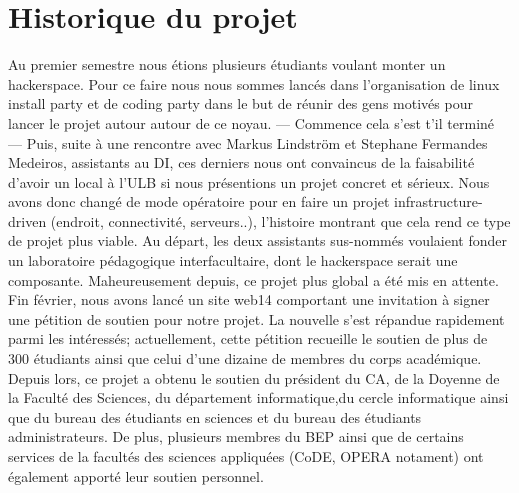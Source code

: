 \documentclass[a4paper]{article}
\begin{document}
\section{Historique du projet} %
Au  premier semestre nous étions plusieurs étudiants voulant monter un  hackerspace. Pour ce faire nous nous sommes lancés dans l’organisation  de linux install party et de coding party dans le but de réunir des  gens motivés pour lancer le projet autour autour de ce noyau. --- Commence cela s'est t'il terminé ---
Puis,  suite à une rencontre avec Markus Lindström et Stephane Fermandes  Medeiros, assistants au DI, ces derniers nous ont convaincus de la  faisabilité d’avoir un local à l’ULB si nous présentions un projet  concret et sérieux. Nous avons donc changé  de mode opératoire pour en faire un projet infrastructure-driven  (endroit, connectivité, serveurs..), l’histoire montrant que cela rend  ce type de projet plus viable. Au départ, les deux assistants  sus-nommés voulaient fonder un laboratoire pédagogique  interfacultaire, dont le hackerspace serait une composante.  Maheureusement depuis, ce projet plus global a été mis en attente.
Fin  février, nous avons lancé un site web14 comportant une invitation à  signer une pétition de soutien pour notre projet. La nouvelle s’est  répandue rapidement parmi les intéressés; actuellement, cette  pétition recueille le soutien de plus de 300 étudiants ainsi que celui d’une dizaine de membres du corps académique.
Depuis lors,  ce projet a obtenu le soutien du président du CA, de la Doyenne de la  Faculté des Sciences, du département informatique,du cercle  informatique ainsi que du bureau des étudiants en sciences et du bureau  des étudiants administrateurs. De plus, plusieurs membres du BEP ainsi  que de certains services de la facultés des sciences appliquées  (CoDE, OPERA notament) ont également apporté leur soutien personnel.
\end{document}
